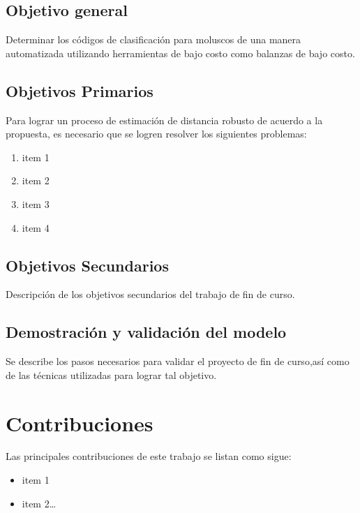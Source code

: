 \subsection{Objetivo general}
Determinar los códigos de clasificación para moluscos de una manera automatizada utilizando herramientas de bajo costo como balanzas de bajo costo.
\subsection{Objetivos Primarios}
Para lograr un proceso de estimación de distancia robusto de acuerdo a la propuesta, es necesario que se logren 
resolver los siguientes problemas: 
\begin{enumerate}
	\item item 1
	\item item 2
	\item item 3
	\item item 4
\end{enumerate}

\subsection{Objetivos Secundarios}
Descripción de los objetivos secundarios del trabajo de fin de curso.
\subsection{Demostración y validación del modelo}
Se describe los pasos necesarios para validar el proyecto de fin de curso,así como de las técnicas utilizadas
para lograr tal objetivo.


\section{Contribuciones}
\label{sec:contribuciones}
Las principales contribuciones de este trabajo se listan como sigue:
\begin{itemize}
  \item item 1
  \item item 2\ldots
 \end{itemize}

